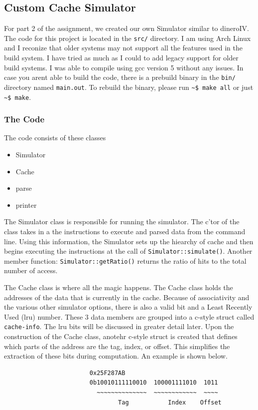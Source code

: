 \documentclass{article}
\begin{document}
	\subsection{Custom Cache Simulator}
		For part 2 of the assignment, we created our own Simulator similar to dineroIV. The code for this project is located in the \verb|src/| directory. I am using Arch Linux and I reconize that older systems may not support all the features used in the build system. I have tried as much as I could to add legacy support for older build systems. I was able to compile using gcc version 5 without any issues. In case you arent able to build the code, there is a prebuild binary in the \verb|bin/| directory named \verb|main.out|. To rebuild the binary, please run \verb|~$ make all| or just \verb|~$ make|.
		\subsubsection{The Code}
			The code consists of these classes
			\begin{itemize}
				\item Simulator
				\item Cache
				\item parse
				\item printer
			\end{itemize}
			The Simulator class is responsible for running the simulator. The c'tor of the class takes in a the instructions to execute and parsed data from the command line. Using this information, the Simulator sets up the hiearchy of cache and then begins executing the instructions at the call of \verb|Simulator::simulate()|. Another member function: \verb|Simulator::getRatio()| returns the ratio of hits to the total number of access.
			\par
			The Cache class is where all the magic happens. The Cache class holds the addresses of the data that is currently in the cache. Because of associativity and the various other simulator options, there is also a valid bit and a Least Recently Used (lru) number. These 3 data members are grouped into a c-style struct called \verb|cache-info|. The lru bits will be discussed in greater detail later. Upon the construction of the Cache class, anotehr c-style struct is created that defines which parts of the address are the tag, index, or offset. This simplifies the extraction of these bits during computation. An example is shown below.
			\begin{center}
			\begin{verbatim}
                        0x25F287AB
                        0b10010111110010  100001111010  1011
                          ~~~~~~~~~~~~~~  ~~~~~~~~~~~~  ~~~~
                                Tag           Index    Offset
			\end{verbatim}
			\end{center}
\end{document}

